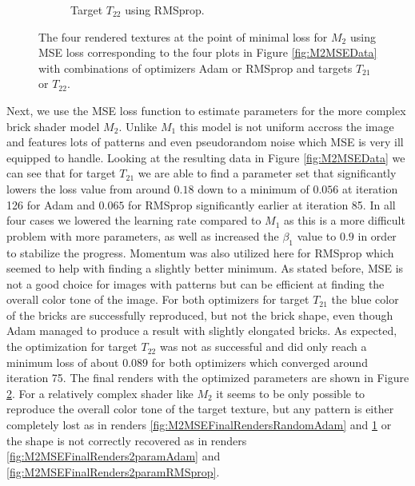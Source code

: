 \begin{figure}[hp]
\begin{subfigure}[t]{.25\textwidth}
    \caption{Target $T_{22}$ using RMSprop.}
    \label{fig:M2MSEFinalRendersRandomRMSprop}
\end{subfigure}
\caption{The four rendered textures at the point of minimal loss for $M_2$ using MSE loss corresponding to the four plots in Figure \ref{fig:M2MSEData} with combinations of optimizers Adam or RMSprop and targets $T_{21}$ or $T_{22}$.}
\label{fig:M2MSEFinalRenders}
\end{figure}

Next, we use the MSE loss function to estimate parameters for the more complex brick shader model $M_2$. Unlike $M_1$ this model is not uniform accross the image and features lots of patterns and even pseudorandom noise which MSE is very ill equipped to handle. Looking at the resulting data in Figure \ref{fig:M2MSEData} we can see that for target $T_{21}$ we are able to find a parameter set that significantly lowers the loss value from around $0.18$ down to a minimum of $0.056$ at iteration 126 for Adam and $0.065$ for RMSprop significantly earlier at iteration 85. In all four cases we lowered the learning rate compared to $M_1$ as this is a more difficult problem with more parameters, as well as increased the $\beta_1$ value to $0.9$ in order to stabilize the progress. Momentum was also utilized here for RMSprop which seemed to help with finding a slightly better minimum. As stated before, MSE is not a good choice for images with patterns but can be efficient at finding the overall color tone of the image. For both optimizers for target $T_{21}$ the blue color of the bricks are successfully reproduced, but not the brick shape, even though Adam managed to produce a result with slightly elongated bricks. As expected, the optimization for target $T_{22}$ was not as successful and did only reach a minimum loss of about $0.089$ for both optimizers which converged around iteration 75. The final renders with the optimized parameters are shown in Figure \ref{fig:M2MSEFinalRenders}. For a relatively complex shader like $M_2$ it seems to be only possible to reproduce the overall color tone of the target texture, but any pattern is either completely lost as in renders \ref{fig:M2MSEFinalRendersRandomAdam} and \ref{fig:M2MSEFinalRendersRandomRMSprop} or the shape is not correctly recovered as in renders \ref{fig:M2MSEFinalRenders2paramAdam} and \ref{fig:M2MSEFinalRenders2paramRMSprop}.

